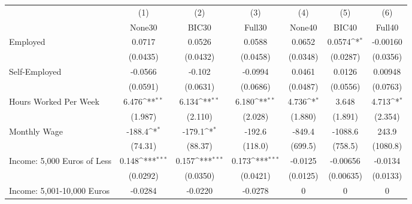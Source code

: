 {
\def\sym#1{\ifmmode^{#1}\else\(^{#1}\)\fi}
\begin{tabular}{l*{6}{c}}
\toprule
            &\multicolumn{1}{c}{(1)}&\multicolumn{1}{c}{(2)}&\multicolumn{1}{c}{(3)}&\multicolumn{1}{c}{(4)}&\multicolumn{1}{c}{(5)}&\multicolumn{1}{c}{(6)}\\
            &\multicolumn{1}{c}{None30}&\multicolumn{1}{c}{BIC30}&\multicolumn{1}{c}{Full30}&\multicolumn{1}{c}{None40}&\multicolumn{1}{c}{BIC40}&\multicolumn{1}{c}{Full40}\\
\midrule
Employed    &      0.0717         &      0.0526         &      0.0588         &      0.0652         &      0.0574\sym{*}  &    -0.00160         \\
            &    (0.0435)         &    (0.0432)         &    (0.0458)         &    (0.0348)         &    (0.0287)         &    (0.0356)         \\
\addlinespace
Self-Employed&     -0.0566         &      -0.102         &     -0.0994         &      0.0461         &      0.0126         &     0.00948         \\
            &    (0.0591)         &    (0.0631)         &    (0.0686)         &    (0.0487)         &    (0.0556)         &    (0.0763)         \\
\addlinespace
Hours Worked Per Week&       6.476\sym{**} &       6.134\sym{**} &       6.180\sym{**} &       4.736\sym{*}  &       3.648         &       4.713\sym{*}  \\
            &     (1.987)         &     (2.110)         &     (2.028)         &     (1.880)         &     (1.891)         &     (2.354)         \\
\addlinespace
Monthly Wage&      -188.4\sym{*}  &      -179.1\sym{*}  &      -192.6         &      -849.4         &     -1088.6         &       243.9         \\
            &     (74.31)         &     (88.37)         &     (118.0)         &     (699.5)         &     (758.5)         &    (1080.8)         \\
\addlinespace
Income: 5,000 Euros of Less&       0.148\sym{***}&       0.157\sym{***}&       0.173\sym{***}&     -0.0125         &    -0.00656         &     -0.0134         \\
            &    (0.0292)         &    (0.0350)         &    (0.0421)         &    (0.0125)         &   (0.00635)         &    (0.0133)         \\
\addlinespace
Income: 5,001-10,000 Euros&     -0.0284         &     -0.0220         &     -0.0278         &           0         &           0         &           0         \\

\end{tabular}}
